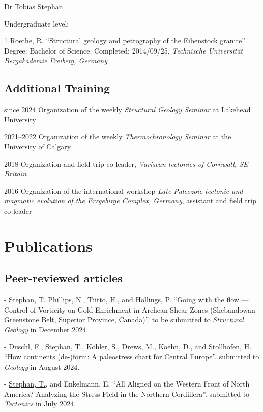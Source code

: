\documentclass[10pt, paper=letter]{scrartcl} %
\begin{document}
\begin{cv}{\textsf{Dr Tobias Stephan}}
\begin{cvlist}{Undergraduate level:}
        \item[1] Roethe, R. \enquote{Structural geology and petrography of the Eibenstock granite}\\
        Degree: Bachelor of Science. Completed: 2014/09/25, \textit{Technische Universität Bergakademie Freiberg, Germany}
    \end{cvlist}

    \subsection{Additional Training}
    \begin{cvlist}{}
        \item[since 2024] Organization of the weekly \textit{Structural Geology Seminar} at
        Lakehead University
        \item[2021--2022] Organization of the weekly \textit{Thermochronology Seminar} at the University of Calgary
        \item[2018] Organization and field trip co-leader, \textit{Variscan tectonics of Cornwall, SE Britain}
        \item[2016] Organization of the international workshop \textit{Late Paleozoic tectonic and magmatic evolution of the Erzgebirge Complex, Germany}, assistant and field trip co-leader
    \end{cvlist}

    \section{Publications}
    \subsection{Peer-reviewed articles}
    \setul{1pt}{.4pt}%
    \begin{cvlist}{}
        \item[-] \ul{Stephan, T.}  Phillips, N., Tiitto, H., and Hollings, P. \enquote{Going with the flow --- Control of  Vorticity on Gold Enrichment in Archean Shear Zones (Shebandowan Greenstone Belt, Superior Province, Canada)}. to be submitted to \textit{Structural Geology} in December 2024.

        
        \item[-] Duschl, F., \ul{Stephan, T.}, K\"ohler, S., Drews, M., Koehn, D., and Stollhofen, H. \enquote{How continents (de-)form: A paleostress chart for Central Europe}. submitted to \textit{Geology} in August 2024.
        \item[-] \ul{Stephan, T.}, and Enkelmann, E. \enquote{All Aligned on the Western Front of North America? Analyzing the Stress Field in the Northern Cordillera}. submitted to \textit{Tectonics} in July 2024.


\end{cvlist}
\end{cv}
\end{document}
